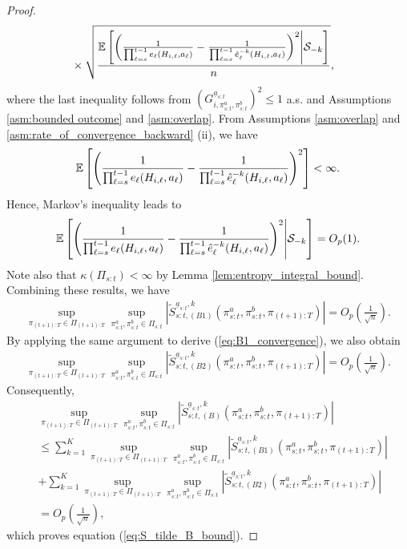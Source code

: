 \begin{proof}
\begin{align*}
&\times	\sqrt{\frac{\mathbb{E}\left[\left(\frac{1}{\prod_{\ell=s}^{t-1}e_{\ell}(H_{i,\ell},a_{\ell})}-\frac{1}{\prod_{\ell=s}^{t-1}\hat{e}_{\ell}^{-k}(H_{i,\ell},a_{\ell})}\right)^{2}\middle|\mathcal{S}_{-k} \right]}{n}},
\end{align*}
where the last inequality follows from $\left(G_{i,\pi_{s:t}^{a},\pi_{s:t}^{b}}^{\underline{a}_{s:t}}\right)^{2}\leq 1$ a.s. and Assumptions \ref{asm:bounded outcome} and \ref{asm:overlap}. From Assumptions \ref{asm:overlap} and \ref{asm:rate_of_convergence_backward} (ii), we have
\begin{align*}
    \mathbb{E}\left[\left(\frac{1}{\prod_{\ell=s}^{t-1}e_{\ell}(H_{i,\ell},a_{\ell})}-\frac{1}{\prod_{\ell=s}^{t-1}\hat{e}_{\ell}^{-k}(H_{i,\ell},a_{\ell})}\right)^{2}\right] < \infty.
\end{align*}
Hence, Markov's inequality leads to
\begin{align*}
    \mathbb{E}\left[\left(\frac{1}{\prod_{\ell=s}^{t-1}e_{\ell}(H_{i,\ell},a_{\ell})}-\frac{1}{\prod_{\ell=s}^{t-1}\hat{e}_{\ell}^{-k}(H_{i,\ell},a_{\ell})}\right)^{2}\middle|\mathcal{S}_{-k} \right] = O_p(1).
\end{align*}
Note also that $\kappa(\Pi_{s:t})<\infty$ by Lemma \ref{lem:entropy_integral_bound}. Combining these results, we have
\begin{align}
   \sup_{\pi_{(t+1):T}\in\Pi_{(t+1):T}}
    \sup_{\pi_{s:t}^{a},\pi_{s:t}^{b}\in\Pi_{s:t}}\left|\widetilde{S}_{s:t,(B1)}^{\underline{a}_{s:t},k}(\pi_{s:t}^{a},\pi_{s:t}^{b},\pi_{(t+1):T})\right| = O_p \left(\frac{1}{\sqrt{n}}\right).  \label{eq:B1_convergence}
\end{align}
By applying the same argument to derive (\ref{eq:B1_convergence}), we also obtain 
\begin{align*}
   \sup_{\pi_{(t+1):T}\in\Pi_{(t+1):T}}
    \sup_{\pi_{s:t}^{a},\pi_{s:t}^{b}\in\Pi_{s:t}}\left|\widetilde{S}_{s:t,(B2)}^{\underline{a}_{s:t},k}(\pi_{s:t}^{a},\pi_{s:t}^{b},\pi_{(t+1):T})\right| = O_p \left(\frac{1}{\sqrt{n}}\right).
\end{align*}
Consequently, 
\begin{align*}
    &\sup_{\pi_{(t+1):T}\in\Pi_{(t+1):T}}
    \sup_{\pi_{s:t}^{a},\pi_{s:t}^{b}\in\Pi_{s:t}}\left|\widetilde{S}_{s:t,(B)}^{\underline{a}_{s:t},k}(\pi_{s:t}^{a},\pi_{s:t}^{b},\pi_{(t+1):T})\right|\\
    &\leq  \sum_{k=1}^{K}\sup_{\pi_{(t+1):T}\in\Pi_{(t+1):T}}
    \sup_{\pi_{s:t}^{a},\pi_{s:t}^{b}\in\Pi_{s:t}}\left|\widetilde{S}_{s:t,(B1)}^{\underline{a}_{s:t},k}(\pi_{s:t}^{a},\pi_{s:t}^{b},\pi_{(t+1):T})\right|\\
    & + \sum_{k=1}^{K}\sup_{\pi_{(t+1):T}\in\Pi_{(t+1):T}}
    \sup_{\pi_{s:t}^{a},\pi_{s:t}^{b}\in\Pi_{s:t}}\left|\widetilde{S}_{s:t,(B2)}^{\underline{a}_{s:t},k}(\pi_{s:t}^{a},\pi_{s:t}^{b},\pi_{(t+1):T})\right|\\
    &= O_p \left(\frac{1}{\sqrt{n}}\right),
\end{align*}
which proves equation (\ref{eq:S_tilde_B_bound}).


\end{proof}
